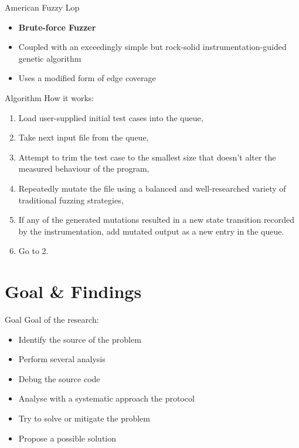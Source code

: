 \documentclass[11pt,t]{beamer}
\begin{document}
\begin{frame}[fragile]{American Fuzzy Lop}  
	
	\begin{itemize}
		\item \textbf{Brute-force Fuzzer} 
		\item Coupled with an exceedingly simple but rock-solid instrumentation-guided genetic algorithm
		\item Uses a modified form of edge coverage 
	\end{itemize} 
	 
\sed
\end{frame}

\begin{frame}[fragile]{Algorithm} 
How it works:
\begin{enumerate}
  \item Load user-supplied initial test cases into the queue,
  \item Take next input file from the queue,
  \item Attempt to trim the test case to the smallest size that doesn't alter the measured behaviour of the program,
  \item Repeatedly mutate the file using a balanced and well-researched variety of traditional fuzzing strategies,
  \item If any of the generated mutations resulted in a new state transition recorded by the instrumentation, add mutated output as a new entry in the queue.
  \item Go to 2.
\end{enumerate}

\pdfnote{}

\sed
\end{frame}





 \section{Goal \& Findings} 
 \begin{frame}[fragile]{Goal}  
	Goal of the research:
	\begin{itemize}
		\item Identify the source of the problem
		\item Perform several analysis
		\item Debug the source code 
		\item Analyse with a systematic approach the protocol
		\item Try to solve or mitigate the problem
		\item Propose a possible solution
	\end{itemize}

 \sed
 \end{frame}
\end{document}
